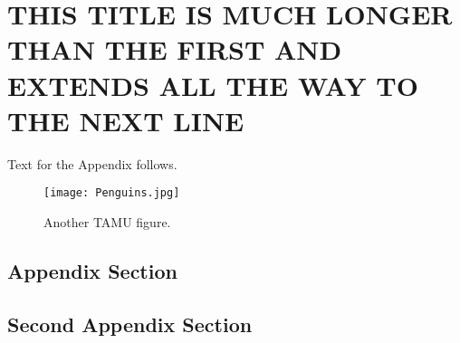 %
%
%
%	 
%


\chapter{\uppercase {This Title Is Much Longer Than The First and Extends All the Way to the Next Line}}

Text for the Appendix follows.

\begin{figure}[h]
\centering
\texttt{[image: Penguins.jpg]}
\caption{Another TAMU figure.}
\label{fig:tamu-fig6}
\end{figure}

\section{Appendix Section}

\section{Second Appendix Section}


\pagebreak{}
